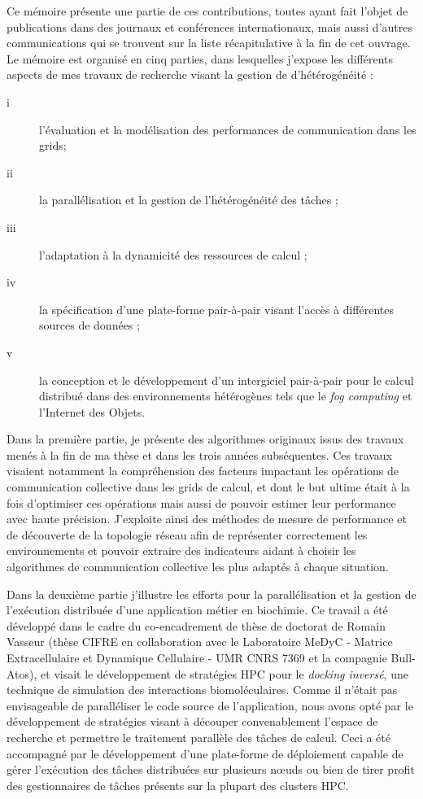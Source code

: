 Ce mémoire présente une partie de ces contributions, toutes ayant fait l'objet de publications dans des journaux et conférences internationaux, mais aussi d'autres communications qui se trouvent sur la liste récapitulative à la fin de cet ouvrage. Le mémoire est organisé en cinq parties, dans lesquelles j'expose les différents aspects de mes travaux de recherche visant la gestion de d'hétérogénéité :
\begin{description}
	\item[i] l'évaluation et la modélisation des performances de communication dans les grids; 
	\item [ii] la parallélisation et la gestion de l'hétérogénéité des tâches ;
	\item [iii] l'adaptation à la dynamicité des ressources de calcul ;
	\item [iv] la spécification d'une plate-forme pair-à-pair visant l'accès à différentes sources de données ;
	\item [v] la conception et le développement d'un intergiciel pair-à-pair pour le calcul distribué dans des environnements hétérogènes tels que le \textit{fog computing} et l'Internet des Objets.
\end{description}


Dans la première partie, je présente des algorithmes originaux issus des travaux menés à la fin de ma thèse et dans les trois années subséquentes. Ces travaux visaient notamment la compréhension des facteurs impactant les opérations de communication collective dans les grids de calcul, et dont le but ultime était à la fois d'optimiser ces opérations mais aussi de pouvoir estimer leur performance avec haute précision.  J'exploite ainsi des méthodes de mesure de performance et de découverte de la topologie réseau afin de représenter correctement les environnements et pouvoir extraire des indicateurs aidant à choisir les algorithmes de communication collective les plus adaptés à chaque situation. 

Dans la deuxième partie j'illustre les efforts pour la parallélisation et la gestion de l'exécution distribuée d'une application métier en biochimie. Ce travail a été développé dans le cadre du co-encadrement de thèse de doctorat de Romain Vasseur (thèse CIFRE en collaboration avec le Laboratoire MeDyC - Matrice Extracellulaire et Dynamique Cellulaire - UMR CNRS 7369 et la compagnie Bull-Atos), et visait le développement de stratégies HPC pour le \textit{docking inversé}, une technique de simulation des interactions biomoléculaires. Comme il n'était pas envisageable de paralléliser le code source de l'application, nous avons opté par le développement de stratégies visant à découper convenablement l'espace de recherche et permettre le traitement parallèle des tâches de calcul. Ceci a été accompagné par le développement d'une plate-forme de déploiement capable de gérer l'exécution des tâches distribuées sur plusieurs n{\oe}uds ou bien de tirer profit des gestionnaires de tâches présents sur la plupart des clusters HPC. 


